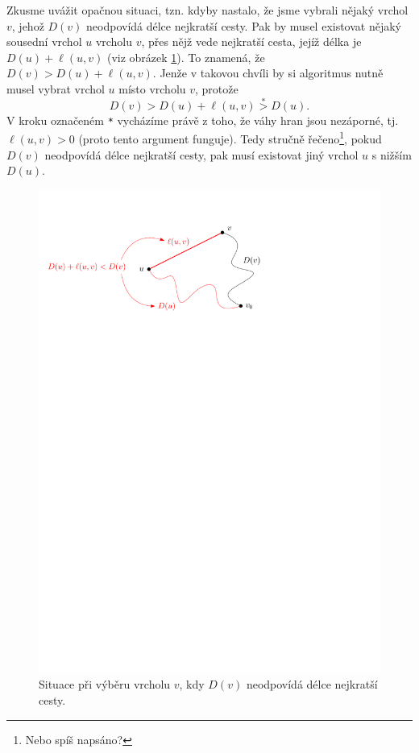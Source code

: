 Zkusme uvážit opačnou situaci, tzn. kdyby nastalo, že jsme vybrali nějaký vrchol $v$, jehož $D(v)$ neodpovídá délce nejkratší cesty. Pak by musel existovat nějaký sousední vrchol $u$ vrcholu $v$, přes nějž vede nejkratší cesta, jejíž délka je $D(u)+\ell(u,v)$ (viz obrázek \ref{fig:dijkstra_vyber_vrcholu}). To znamená, že $D(v)>D(u)+\ell(u,v)$. Jenže v takovou chvíli by si algoritmus nutně musel vybrat vrchol $u$ místo vrcholu $v$, protože
\[D(v)>D(u)+\ell(u,v)\stackrel{\texttt{*}}{>}D(u).\]
V kroku označeném \texttt{*} vycházíme právě z toho, že váhy hran jsou nezáporné, tj. $\ell(u,v)>0$ (proto tento argument funguje). Tedy stručně řečeno\footnote{Nebo spíš napsáno?}, pokud $D(v)$ neodpovídá délce nejkratší cesty, pak musí existovat jiný vrchol $u$ s nižším $D(u)$.
\begin{figure}[h]
    \centering
    \includegraphics[scale=\graphimgsize]{components/images/ch01_dijkstra_vyber_vrcholu.pdf}
    \caption{Situace při výběru vrcholu $v$, kdy $D(v)$ neodpovídá délce nejkratší cesty.}
    \label{fig:dijkstra_vyber_vrcholu}
\end{figure}

